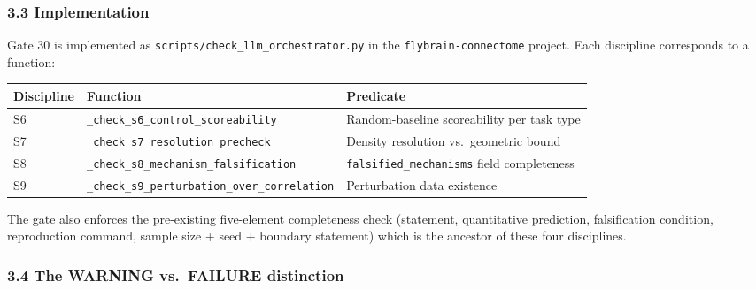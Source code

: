 \documentclass[
]{article}
\newcounter{none} %
\begin{document}
\subsubsection{3.3 Implementation}\label{implementation}

Gate 30 is implemented as \texttt{scripts/check\_llm\_orchestrator.py}
in the \texttt{flybrain-connectome} project. Each discipline corresponds
to a function:

{\def\LTcaptype{none} %
\begin{longtable}[]{@{}
  >{\raggedright\arraybackslash}p{}
  >{\raggedright\arraybackslash}p{}
  >{\raggedright\arraybackslash}p{}@{}}
\toprule\noalign{}
\begin{minipage}[b]{\linewidth}\raggedright
Discipline
\end{minipage} & \begin{minipage}[b]{\linewidth}\raggedright
Function
\end{minipage} & \begin{minipage}[b]{\linewidth}\raggedright
Predicate
\end{minipage} \\
\midrule\noalign{}
\endhead
\bottomrule\noalign{}
\endlastfoot
S6 & \texttt{\_check\_s6\_control\_scoreability} & Random-baseline
scoreability per task type \\
S7 & \texttt{\_check\_s7\_resolution\_precheck} & Density resolution
vs.~geometric bound \\
S8 & \texttt{\_check\_s8\_mechanism\_falsification} &
\texttt{falsified\_mechanisms} field completeness \\
S9 & \texttt{\_check\_s9\_perturbation\_over\_correlation} &
Perturbation data existence \\
\end{longtable}
}

The gate also enforces the pre-existing five-element completeness check
(statement, quantitative prediction, falsification condition,
reproduction command, sample size + seed + boundary statement) which is
the ancestor of these four disciplines.

\subsubsection{3.4 The WARNING vs.~FAILURE
distinction}\label{the-warning-vs.-failure-distinction}
\end{document}
